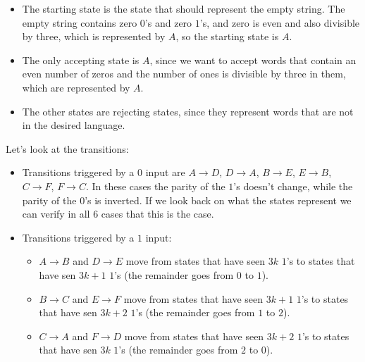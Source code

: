 \begin{itemize}
    \item The starting state is the state that should represent the empty string. The empty string contains zero $0$'s and zero $1$'s, and zero is even and also divisible by three, which is represented by $A$, so the starting state is $A$.
    \item The only accepting state is $A$, since we want to accept words that contain an even number of zeros and the number of ones is divisible by three in them, which are represented by $A$.
    \item The other states are rejecting states, since they represent words that are not in the desired language.
\end{itemize}

Let's look at the transitions:

\begin{itemize}
    \item Transitions triggered by a $0$ input are $A\rightarrow{}D$, $D\rightarrow{}A$, $B\rightarrow{}E$, $E\rightarrow{}B$, $C\rightarrow{}F$, $F\rightarrow{}C$. In these cases the parity of the $1$'s doesn't change, while the parity of the $0$'s is inverted. If we look back on what the states represent we can verify in all $6$ cases that this is the case.
    \item Transitions triggered by a $1$ input:
    \begin{itemize}
        \item $A\rightarrow{}B$ and $D\rightarrow{}E$ move from states that have seen $3k$ $1$'s to states that have sen $3k+1$ $1$'s (the remainder goes from $0$ to $1$).
        \item $B\rightarrow{}C$ and $E\rightarrow{}F$ move from states that have seen $3k+1$ $1$'s to states that have sen $3k+2$ $1$'s (the remainder goes from $1$ to $2$).
        \item $C\rightarrow{}A$ and $F\rightarrow{}D$ move from states that have seen $3k+2$ $1$'s to states that have sen $3k$ $1$'s (the remainder goes from $2$ to $0$).
    \end{itemize}
\end{itemize}